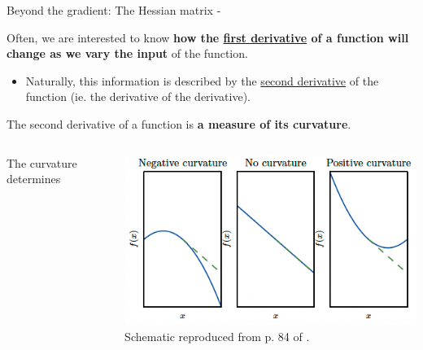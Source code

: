 

\begin{frame}[t,allowframebreaks]{
    Beyond the gradient: The Hessian matrix -}

    Often, we are interested to know {\bf how the 
    \underline{first derivative} of a 
    function will change as we vary the input} of the function.\\
    \begin{itemize}
        \item
        Naturally, this information is described by the 
        \underline{second derivative} of the function 
        (ie. the derivative of the derivative).\\
    \end{itemize}

    \vspace{0.2cm}

    The second derivative of a function is {\bf a measure of its curvature}.\\

    \begin{columns}
        \begin{column}{0.42\textwidth}
        
            The curvature determines

        \end{column}
        \begin{column}{0.58\textwidth}

            \begin{center}
                \includegraphics[width=1.00\textwidth]
                    {./images/grad_descent/goodfellow17_curvature_1d.png}\\
                {\tiny 
                    \color{col:attribution} 
                    Schematic reproduced from p. 84 of \cite{Goodfellow:2017MITDL}.\\
                }
            \end{center}        
        

\end{column}
\end{columns}
\end{frame}
